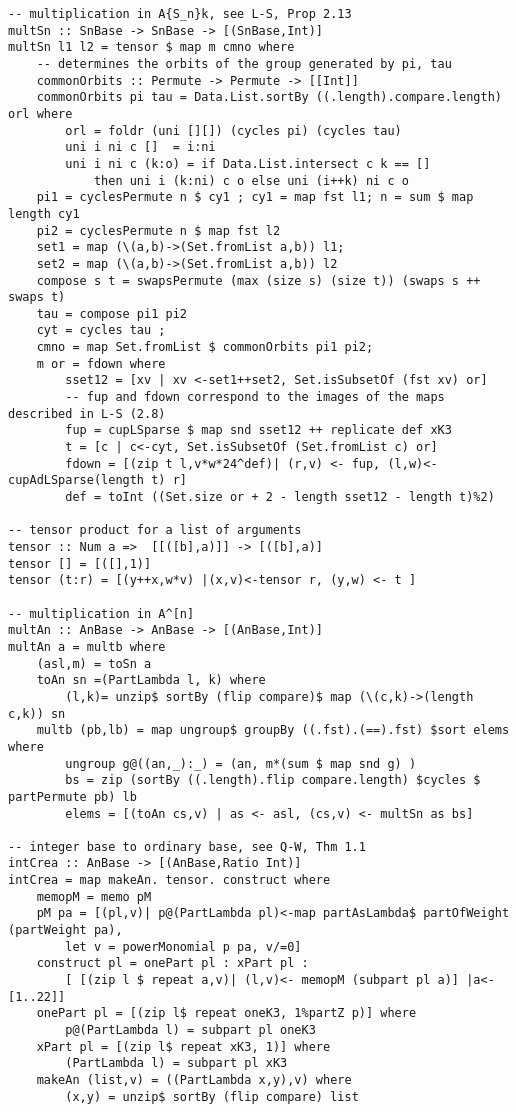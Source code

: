 \begin{lstlisting}
-- multiplication in A{S_n}k, see L-S, Prop 2.13
multSn :: SnBase -> SnBase -> [(SnBase,Int)]
multSn l1 l2 = tensor $ map m cmno where
	-- determines the orbits of the group generated by pi, tau
	commonOrbits :: Permute -> Permute -> [[Int]]
	commonOrbits pi tau = Data.List.sortBy ((.length).compare.length) orl where
		orl = foldr (uni [][]) (cycles pi) (cycles tau) 
		uni i ni c []  = i:ni
		uni i ni c (k:o) = if Data.List.intersect c k == [] 
			then uni i (k:ni) c o else uni (i++k) ni c o
	pi1 = cyclesPermute n $ cy1 ; cy1 = map fst l1; n = sum $ map length cy1
	pi2 = cyclesPermute n $ map fst l2
	set1 = map (\(a,b)->(Set.fromList a,b)) l1; 
	set2 = map (\(a,b)->(Set.fromList a,b)) l2
	compose s t = swapsPermute (max (size s) (size t)) (swaps s ++ swaps t)
	tau = compose pi1 pi2
	cyt = cycles tau ; 
	cmno = map Set.fromList $ commonOrbits pi1 pi2; 
	m or = fdown where
		sset12 = [xv | xv <-set1++set2, Set.isSubsetOf (fst xv) or]
		-- fup and fdown correspond to the images of the maps described in L-S (2.8)
		fup = cupLSparse $ map snd sset12 ++ replicate def xK3
		t = [c | c<-cyt, Set.isSubsetOf (Set.fromList c) or]
		fdown = [(zip t l,v*w*24^def)| (r,v) <- fup, (l,w)<-cupAdLSparse(length t) r] 
		def = toInt ((Set.size or + 2 - length sset12 - length t)%2)

-- tensor product for a list of arguments
tensor :: Num a =>  [[([b],a)]] -> [([b],a)]
tensor [] = [([],1)]
tensor (t:r) = [(y++x,w*v) |(x,v)<-tensor r, (y,w) <- t ]

-- multiplication in A^[n]
multAn :: AnBase -> AnBase -> [(AnBase,Int)]
multAn a = multb where
	(asl,m) = toSn a
	toAn sn =(PartLambda l, k) where 
		(l,k)= unzip$ sortBy (flip compare)$ map (\(c,k)->(length c,k)) sn
	multb (pb,lb) = map ungroup$ groupBy ((.fst).(==).fst) $sort elems where
		ungroup g@((an,_):_) = (an, m*(sum $ map snd g) )
		bs = zip (sortBy ((.length).flip compare.length) $cycles $ partPermute pb) lb
		elems = [(toAn cs,v) | as <- asl, (cs,v) <- multSn as bs]

-- integer base to ordinary base, see Q-W, Thm 1.1
intCrea :: AnBase -> [(AnBase,Ratio Int)]
intCrea = map makeAn. tensor. construct where
	memopM = memo pM
	pM pa = [(pl,v)| p@(PartLambda pl)<-map partAsLambda$ partOfWeight (partWeight pa), 
		let v = powerMonomial p pa, v/=0]
	construct pl = onePart pl : xPart pl : 
		[ [(zip l $ repeat a,v)| (l,v)<- memopM (subpart pl a)] |a<-[1..22]] 
	onePart pl = [(zip l$ repeat oneK3, 1%partZ p)] where 
		p@(PartLambda l) = subpart pl oneK3
	xPart pl = [(zip l$ repeat xK3, 1)] where 
		(PartLambda l) = subpart pl xK3
	makeAn (list,v) = ((PartLambda x,y),v) where 
		(x,y) = unzip$ sortBy (flip compare) list 


\end{lstlisting}
